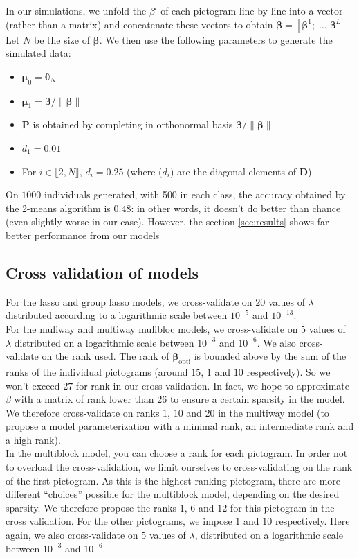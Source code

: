 \documentclass[preprint,12pt]{elsarticle}
\begin{document}
\noindent In our simulations, we unfold the $\beta^l$ of each pictogram line by line into a vector (rather than a matrix) and concatenate these vectors to obtain $\bm{\beta} = [\bm{\beta}^1; \; \hdots \; \bm{\beta}^L]$. Let $N$ be the size of $\bm{\beta}$. We then use the following parameters to generate the simulated data:
\begin{itemize}[label = $\bullet$]
    \item $\bm{\mu}_0 = \mathbb{0}_N$
    \item $\bm{\mu}_1 = \bm{\beta}/\lVert \bm{\beta}\rVert$ 
    \item $\mathbf{P}$ is obtained by completing in orthonormal basis $\bm{\beta}/\lVert \bm{\beta}\rVert$
    \item $d_1 = 0.01$
    \item For $i \in \llbracket 2, N \rrbracket$, $d_i = 0.25$ (where ($d_i$) are the diagonal elements of $\mathbf{D}$) 
\end{itemize}

On $1000$ individuals generated, with 500 in each class, the accuracy obtained by the 2-means algorithm is $0.48$: in other words, it doesn't do better than chance (even slightly worse in our case). However, the section \ref{sec:results} shows far better performance from our models

\subsection{Cross validation of models}

\noindent For the lasso and group lasso models, we cross-validate on $20$ values of $\lambda$ distributed according to a logarithmic scale between $10^{-5}$ and $10^{-13}$.\\
\indent For the muliway and multiway mulibloc models, we cross-validate on $5$ values of $\lambda$ distributed on a logarithmic scale between $10^{-3}$ and $10^{-6}$. We also cross-validate on the rank used. The rank of $\bm{\beta}_{\text{opti}}$ is bounded above by the sum of the ranks of the individual pictograms (around $15$, $1$ and $10$ respectively). So we won't exceed $27$ for rank in our cross validation. In fact, we hope to approximate $\beta$ with a matrix of rank lower than $26$ to ensure a certain sparsity in the model. We therefore cross-validate on ranks $1$, $10$ and $20$ in the multiway model (to propose a model parameterization with a minimal rank, an intermediate rank and a high rank).\\
\indent In the multiblock model, you can choose a rank for each pictogram. In order not to overload the cross-validation, we limit ourselves to cross-validating on the rank of the first pictogram. As this is the highest-ranking pictogram, there are more different “choices” possible for the multiblock model, depending on the desired sparsity. We therefore propose the ranks $1$, $6$ and $12$ for this pictogram in the cross validation. For the other pictograms, we impose $1$ and $10$ respectively. Here again, we also cross-validate on $5$ values of $\lambda$, distributed on a logarithmic scale between $10^{-3}$ and $10^{-6}$.
\end{document}

